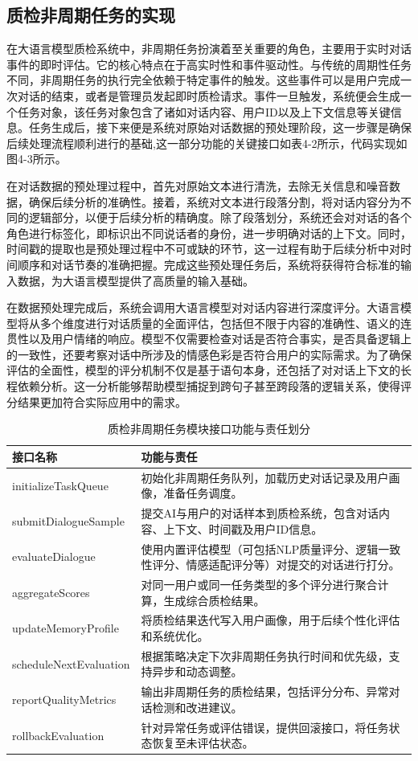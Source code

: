 \subsection{质检非周期任务的实现}
在大语言模型质检系统中，非周期任务扮演着至关重要的角色，主要用于实时对话事件的即时评估。它的核心特点在于高实时性和事件驱动性。与传统的周期性任务不同，非周期任务的执行完全依赖于特定事件的触发。这些事件可以是用户完成一次对话的结束，或者是管理员发起即时质检请求。事件一旦触发，系统便会生成一个任务对象，该任务对象包含了诸如对话内容、用户ID以及上下文信息等关键信息。任务生成后，接下来便是系统对原始对话数据的预处理阶段，这一步骤是确保后续处理流程顺利进行的基础,这一部分功能的关键接口如表4-2所示，代码实现如图4-3所示。

在对话数据的预处理过程中，首先对原始文本进行清洗，去除无关信息和噪音数据，确保后续分析的准确性。接着，系统对文本进行段落分割，将对话内容分为不同的逻辑部分，以便于后续分析的精确度。除了段落划分，系统还会对对话的各个角色进行标签化，即标识出不同说话者的身份，进一步明确对话的上下文。同时，时间戳的提取也是预处理过程中不可或缺的环节，这一过程有助于后续分析中对时间顺序和对话节奏的准确把握。完成这些预处理任务后，系统将获得符合标准的输入数据，为大语言模型提供了高质量的输入基础。

在数据预处理完成后，系统会调用大语言模型对对话内容进行深度评分。大语言模型将从多个维度进行对话质量的全面评估，包括但不限于内容的准确性、语义的连贯性以及用户情绪的响应。模型不仅需要检查对话是否符合事实，是否具备逻辑上的一致性，还要考察对话中所涉及的情感色彩是否符合用户的实际需求。为了确保评估的全面性，模型的评分机制不仅是基于语句本身，还包括了对对话上下文的长程依赖分析。这一分析能够帮助模型捕捉到跨句子甚至跨段落的逻辑关系，使得评分结果更加符合实际应用中的需求。
\begin{table}[H]
\centering
\caption{质检非周期任务模块接口功能与责任划分}
\label{tab:nonperiodic-module}
{\renewcommand{\arraystretch}{1.2}
\begin{tabular}{p{4cm} p{10cm}}
\hline
接口名称 & 功能与责任 \\
\hline
initializeTaskQueue & 初始化非周期任务队列，加载历史对话记录及用户画像，准备任务调度。 \\ \hline
submitDialogueSample & 提交AI与用户的对话样本到质检系统，包含对话内容、上下文、时间戳及用户ID信息。 \\ \hline
evaluateDialogue & 使用内置评估模型（可包括NLP质量评分、逻辑一致性评分、情感适配评分等）对提交的对话进行打分。 \\ \hline
aggregateScores & 对同一用户或同一任务类型的多个评分进行聚合计算，生成综合质检结果。 \\
updateMemoryProfile & 将质检结果迭代写入用户画像，用于后续个性化评估和系统优化。 \\
scheduleNextEvaluation & 根据策略决定下次非周期任务执行时间和优先级，支持异步和动态调整。 \\ \hline
reportQualityMetrics & 输出非周期任务的质检结果，包括评分分布、异常对话检测和改进建议。 \\ \hline
rollbackEvaluation & 针对异常任务或评估错误，提供回滚接口，将任务状态恢复至未评估状态。 \\ 
\hline
\end{tabular}}
\end{table}

